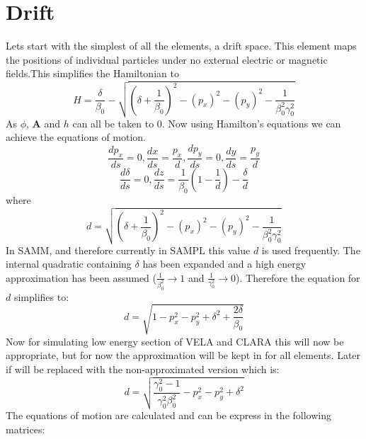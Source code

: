 \documentclass[11pt,a4paper]{article}
\begin{document}
	\section{Drift}
	Lets start with the simplest of all the elements, a drift space. This element maps the positions of individual particles under no external electric or magnetic fields.This simplifies the Hamiltonian to 
	\[
	H=\frac{\delta}{\beta_0}-\sqrt{(\delta+\frac{1}{\beta_0})^2-(p_x)^2-(p_y)^2-\frac{1}{\beta_0^2\gamma_0^2}}
	\]
	As $\phi$, $\textbf{A}$ and $h$ can all be taken to 0. Now using Hamilton's equations we can achieve the equations of motion.
	\[
	\frac{dp_x}{ds}=0, \frac{dx}{ds}=\frac{p_x}{d}, \frac{dp_y}{ds}=0, \frac{dy}{ds}=\frac{p_y}{d}
	\]
	\[
	\frac{d\delta}{ds}=0, \frac{dz}{ds}=\frac{1}{\beta_0}(1-\frac{1}{d})-\frac{\delta}{d}
	\]
	where
	\[
	d=\sqrt{(\delta+\frac{1}{\beta_0})^2-(p_x)^2-(p_y)^2-\frac{1}{\beta_0^2\gamma_0^2}}
	\]	
	In SAMM, and therefore currently in SAMPL this value $d$ is used frequently. The internal quadratic containing $\delta$ has been expanded and a high energy approximation has been assumed ($\frac{1}{\beta_0^2}\rightarrow1$ and $\frac{1}{\gamma_0^2}\rightarrow0$).
	Therefore the equation for $d$ simplifies to:
	\[
	d=\sqrt{1-p_x^2-p_y^2+\delta^2+\frac{2\delta}{\beta_0}}
	\]	
	Now for simulating low energy section of VELA and CLARA this will now be appropriate, but for now the approximation will be kept in for all elements. Later if will be replaced with the non-approximated version which is:
	\[
	d=\sqrt{\frac{\gamma_0^2-1}{\gamma_0^2\beta_0^2}-p_x^2-p_y^2+\delta^2}
	\]	
	The equations of motion are calculated and can be express in the following matrices:
\end{document}
